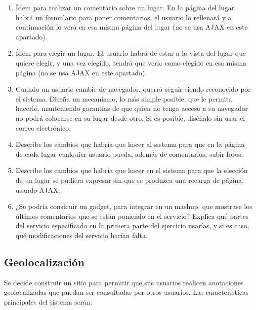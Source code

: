 {\begin{enumerate}
\item Ídem para realizar un comentario sobre un  lugar. En la página del lugar habrá un  formulario para poner comentarios, el usuario lo rellenará y a continuación lo verá en esa misma página del lugar (no se usa AJAX en este apartado).

\item Ídem para elegir un  lugar. El usuario habrá de estar a la vista del lugar que quiere elegir, y una vez elegido, tendrá que verlo como elegido en esa misma página (no se usa AJAX en este apartado).

\item Cuando un usuario cambie de navegador, querrá seguir siendo reconocido por el sistema. Diseña un mecanismo, lo más simple posible, que le permita hacerlo, manteniendo garantías de que quien no tenga acceso a su navegador no podrá colocarse en su lugar desde otro. Si es posible, diséñalo sin usar el correo electrónico.

\item Describe los cambios que habría que hacer al sistema para que en la página de cada lugar cualquier usuario pueda, además de comentarios, subir fotos.

\item Describe los cambios que habría que hacer en el sistema para que la elección de un lugar se pudiera expresar sin que se produzca una recarga de página, usando AJAX.

\item ¿Se podría construir un gadget, para integrar en un mashup, que mostrase los últimos comentarios que se están poniendo en el servicio? Explica qué partes del servicio especificado en la primera parte del ejercicio usarías, y si es caso, qué modificaciones del servicio harían falta.
\end{enumerate}

\subsection{Geolocalización}

Se decide construir un sitio para permitir que sus usuarios realicen
anotaciones geolocalizadas que puedan ser consultadas por
otros usuarios. Las características principales del sistema serán:

}
